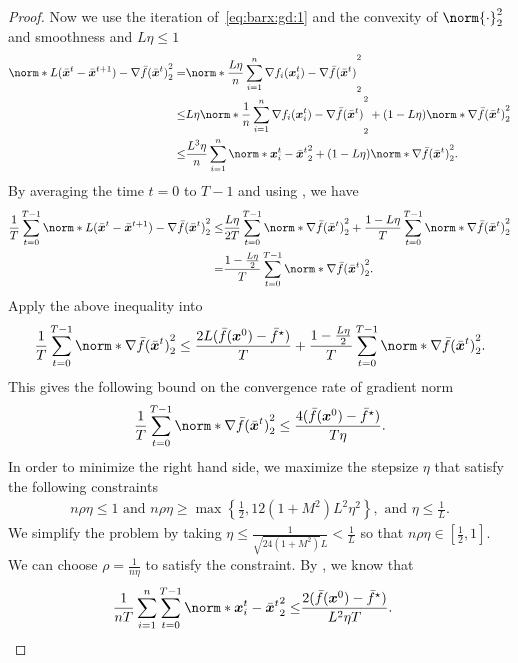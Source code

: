 \documentclass{article}
\begin{document}
\begin{proof}
  Now we use the iteration of~\eqref{eq:barx:gd:1} and the convexity of $\norm{\cdot}_2^2$ and smoothness  and $L\eta\le1$
  \begin{align*}
    \norm*{L(\bar{\xx}^{t}-\bar{\xx}^{t+1}) - \nabla \bar{f}(\bar{\xx}^{t})}_2^2
    =& \norm*{\frac{L \eta}{n} \sum_{i=1}^n \nabla f_i(\xx_i^t) - \nabla \bar{f}(\bar{\xx}^{t})}_2^2 \\
    \le& L\eta\norm*{\frac{1}{n}\sum_{i=1}^n \nabla f_i(\xx_i^t) - \nabla \bar{f}(\bar{\xx}^{t})}_2^2 + (1-L\eta) \norm*{\nabla \bar{f} (\bar{\xx}^{t})}_2^2 \\
    \le& \frac{L^3\eta}{n}\sum_{i=1}^n\norm*{\xx_i^t - \bar{\xx}^{t}}_2^2 + (1-L\eta) \norm*{\nabla \bar{f} (\bar{\xx}^{t})}_2^2.
  \end{align*}
  By averaging the time $t=0$ to $T-1$ and using , we have
  \begin{align*}
    \frac{1}{T}\sum_{t=0}^{T-1}\norm*{L(\bar{\xx}^{t}-\bar{\xx}^{t+1}) - \nabla \bar{f}(\bar{\xx}^{t})}_2^2
    \le&
    \frac{L\eta}{2 T} \sum_{t=0}^{T-1} \norm*{\nabla \bar{f}(\bar{\xx}^t) }_2^2 
    + \frac{1-L\eta}{T}\sum_{t=0}^{T-1} \norm*{\nabla \bar{f} (\bar{\xx}^{t})}_2^2 \\
    =&
    \frac{1-\frac{L\eta}{2}}{T}\sum_{t=0}^{T-1} \norm*{\nabla \bar{f} (\bar{\xx}^{t})}_2^2.
  \end{align*}
  Apply the above inequality into 
  \begin{align*}
    \frac{1}{T} \sum_{t=0}^{T-1} \norm*{\nabla \bar{f}(\bar{\xx}^{t})}_2^2
    \le \frac{2L(\bar{f}(\xx^{0}) - \bar{f}^\star)}{T}
    + \frac{1-\frac{L\eta}{2}}{T}\sum_{t=0}^{T-1} \norm*{\nabla \bar{f} (\bar{\xx}^{t})}_2^2.
  \end{align*}
  This gives the following bound on the convergence rate of gradient norm
  \begin{align*}
    \frac{1}{T} \sum_{t=0}^{T-1} \norm*{\nabla \bar{f}(\bar{\xx}^{t})}_2^2
    \le \frac{4(\bar{f}(\xx^{0}) - \bar{f}^\star)}{T\eta}.
  \end{align*}
  In order to minimize the right hand side, we maximize the stepsize $\eta$  that satisfy the following constraints
  \begin{align*}
    n\rho\eta\le 1 \text{ and } n\rho\eta\ge\max\left\{\frac{1}{2}, 12(1+M^2)L^2\eta^2\right\}, 
    \text{ and } \eta\le \frac{1}{L}.
  \end{align*}
  We simplify the problem by taking $\eta\le \frac{1}{\sqrt{24(1+M^2)}L}<\frac{1}{L}$ so that $n\rho\eta\in[\frac{1}{2}, 1]$. We can choose $\rho=\frac{1}{n\eta}$ to satisfy the constraint. By , we know that
  \begin{align*}
    \frac{1}{nT}\sum_{i=1}^n\sum_{t=0}^{T-1} \norm*{\xx_i^{t} - \bar{\xx}^{t}}_2^2
    \le& \frac{2(\bar{f}(\xx^{0}) - \bar{f}^\star)}{L^2\eta T}.
  \end{align*}
\end{proof}
\end{document}
